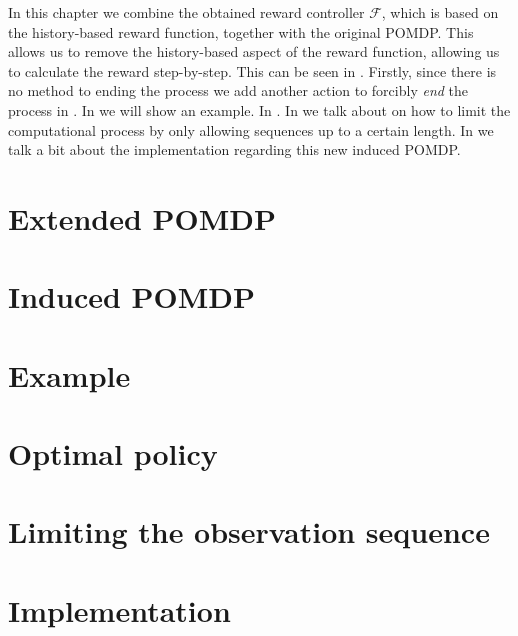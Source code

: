 In this chapter we combine the obtained reward controller $\mathcal{F}$, which is based on the history-based reward function, together with the original POMDP. This allows us to remove the history-based aspect of the reward function, allowing us to calculate the reward step-by-step. This can be seen in . Firstly, since there is no method to ending the process we add another action to forcibly \textit{end} the process in . In  we will show an example. In . In  we talk about on how to limit the computational process by only allowing sequences up to a certain length. In  we talk a bit about the implementation regarding this new induced POMDP.


\section{Extended POMDP}


\section{Induced POMDP}


\section{Example}


\section{Optimal policy}


\section{Limiting the observation sequence}


\section{Implementation}


